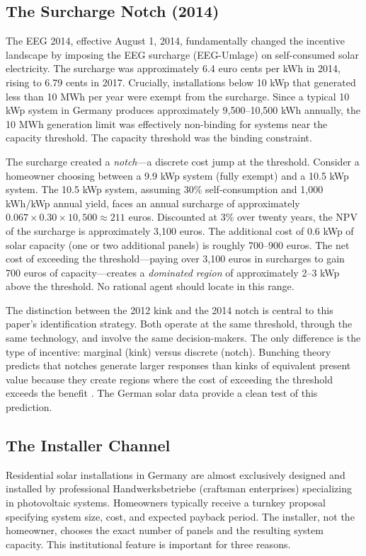 \documentclass[12pt]{article}
\begin{document}
\subsection{The Surcharge Notch (2014)}

The EEG 2014, effective August 1, 2014, fundamentally changed the incentive landscape by imposing the EEG surcharge (EEG-Umlage) on self-consumed solar electricity. The surcharge was approximately 6.4 euro cents per kWh in 2014, rising to 6.79 cents in 2017. Crucially, installations below 10 kWp that generated less than 10 MWh per year were exempt from the surcharge. Since a typical 10 kWp system in Germany produces approximately 9,500--10,500 kWh annually, the 10 MWh generation limit was effectively non-binding for systems near the capacity threshold. The capacity threshold was the binding constraint.

The surcharge created a \textit{notch}---a discrete cost jump at the threshold. Consider a homeowner choosing between a 9.9 kWp system (fully exempt) and a 10.5 kWp system. The 10.5 kWp system, assuming 30\% self-consumption and 1,000 kWh/kWp annual yield, faces an annual surcharge of approximately $0.067 \times 0.30 \times 10{,}500 \approx 211$ euros. Discounted at 3\% over twenty years, the NPV of the surcharge is approximately 3,100 euros. The additional cost of 0.6 kWp of solar capacity (one or two additional panels) is roughly 700--900 euros. The net cost of exceeding the threshold---paying over 3,100 euros in surcharges to gain 700 euros of capacity---creates a \textit{dominated region} of approximately 2--3 kWp above the threshold. No rational agent should locate in this range.

The distinction between the 2012 kink and the 2014 notch is central to this paper's identification strategy. Both operate at the same threshold, through the same technology, and involve the same decision-makers. The only difference is the type of incentive: marginal (kink) versus discrete (notch). Bunching theory predicts that notches generate larger responses than kinks of equivalent present value because they create regions where the cost of exceeding the threshold exceeds the benefit \citep{kleven2016bunching}. The German solar data provide a clean test of this prediction.

\subsection{The Installer Channel}

Residential solar installations in Germany are almost exclusively designed and installed by professional Handwerksbetriebe (craftsman enterprises) specializing in photovoltaic systems. Homeowners typically receive a turnkey proposal specifying system size, cost, and expected payback period. The installer, not the homeowner, chooses the exact number of panels and the resulting system capacity. This institutional feature is important for three reasons.
\end{document}
